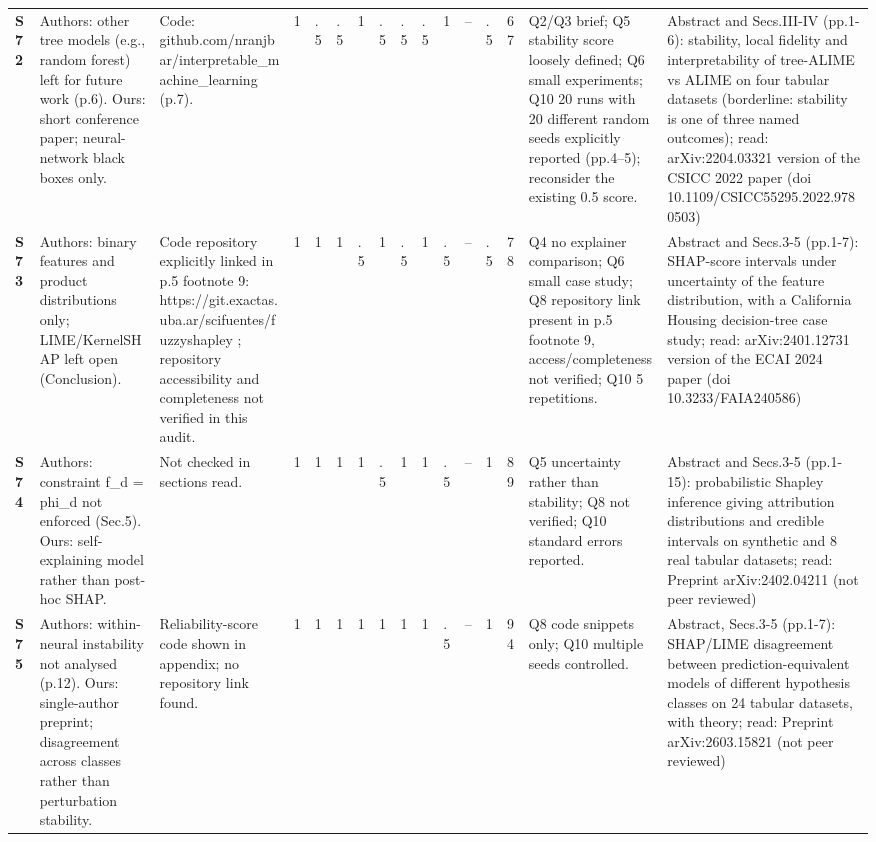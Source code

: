 \begin{longtable}{@{}P{1.0cm}P{4.6cm}P{3.6cm}P{0.3cm}P{0.3cm}P{0.3cm}P{0.3cm}P{0.3cm}P{0.3cm}P{0.3cm}P{0.3cm}P{0.3cm}P{0.36cm}P{0.75cm}P{3.0cm}P{3.9cm}@{}}
\textbf{S72} & Authors: other tree models (e.g., random forest) left for future work (p.6). Ours: short conference paper; neural-network black boxes only. & Code: github.com/\allowbreak{}nranjbar/\allowbreak{}interpretable\_\allowbreak{}machine\_\allowbreak{}learning (p.7). & 1 & .5 & .5 & 1 & .5 & .5 & .5 & 1 & -- & .5 & 67 & Q2/\allowbreak{}Q3 brief; Q5 stability score loosely defined; Q6 small experiments; Q10 20 runs with 20 different random seeds explicitly reported (pp.4--5); reconsider the existing 0.5 score. & Abstract and Secs.III-IV (pp.1-6): stability, local fidelity and interpretability of tree-ALIME vs ALIME on four tabular datasets (borderline: stability is one of three named outcomes); read: arXiv:2204.03321 version of the CSICC 2022 paper (doi 10.1109/\allowbreak{}CSICC55295.2022.9780503) \\
\textbf{S73} & Authors: binary features and product distributions only; LIME/\allowbreak{}KernelSHAP left open (Conclusion). & Code repository explicitly linked in p.5 footnote 9: https:/\allowbreak{}/\allowbreak{}git.exactas.uba.ar/\allowbreak{}scifuentes/\allowbreak{}fuzzyshapley ; repository accessibility and completeness not verified in this audit. & 1 & 1 & 1 & .5 & 1 & .5 & 1 & .5 & -- & .5 & 78 & Q4 no explainer comparison; Q6 small case study; Q8 repository link present in p.5 footnote 9, access/\allowbreak{}completeness not verified; Q10 5 repetitions. & Abstract and Secs.3-5 (pp.1-7): SHAP-score intervals under uncertainty of the feature distribution, with a California Housing decision-tree case study; read: arXiv:2401.12731 version of the ECAI 2024 paper (doi 10.3233/\allowbreak{}FAIA240586) \\
\textbf{S74} & Authors: constraint f\_\allowbreak{}d = phi\_\allowbreak{}d not enforced (Sec.5). Ours: self-explaining model rather than post-hoc SHAP. & Not checked in sections read. & 1 & 1 & 1 & 1 & .5 & 1 & 1 & .5 & -- & 1 & 89 & Q5 uncertainty rather than stability; Q8 not verified; Q10 standard errors reported. & Abstract and Secs.3-5 (pp.1-15): probabilistic Shapley inference giving attribution distributions and credible intervals on synthetic and 8 real tabular datasets; read: Preprint arXiv:2402.04211 (not peer reviewed) \\
\textbf{S75} & Authors: within-neural instability not analysed (p.12). Ours: single-author preprint; disagreement across classes rather than perturbation stability. & Reliability-score code shown in appendix; no repository link found. & 1 & 1 & 1 & 1 & 1 & 1 & 1 & .5 & -- & 1 & 94 & Q8 code snippets only; Q10 multiple seeds controlled. & Abstract, Secs.3-5 (pp.1-7): SHAP/\allowbreak{}LIME disagreement between prediction-equivalent models of different hypothesis classes on 24 tabular datasets, with theory; read: Preprint arXiv:2603.15821 (not peer reviewed) \\

\end{longtable}
